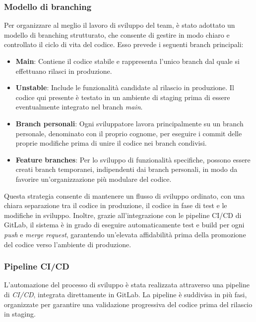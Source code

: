 \subsubsection{Modello di branching}
Per organizzare al meglio il lavoro di sviluppo del team, è stato adottato un modello di branching strutturato, che consente di gestire in modo chiaro e controllato il ciclo di vita del codice. Esso prevede i seguenti branch principali:
\begin{itemize}
  \item \textbf{Main}: Contiene il codice stabile e rappresenta l'unico branch dal quale si effettuano rilasci in produzione.
  \item \textbf{Unstable}: Include le funzionalità candidate al rilascio in produzione. Il codice qui presente è testato in un ambiente di staging prima di essere eventualmente integrato nel branch \textit{main}.
  \item \textbf{Branch personali}: Ogni sviluppatore lavora principalmente su un branch personale, denominato con il proprio cognome, per eseguire i commit delle proprie modifiche prima di unire il codice nei branch condivisi.
  \item \textbf{Feature branches}: Per lo sviluppo di funzionalità specifiche, possono essere creati branch temporanei, indipendenti dai branch personali, in modo da favorire un'organizzazione più modulare del codice.
\end{itemize}
%
Questa strategia consente di mantenere un flusso di sviluppo ordinato, con una chiara separazione tra il codice in produzione, il codice in fase di test e le modifiche in sviluppo. Inoltre, grazie all'integrazione con le pipeline CI/CD di GitLab, il sistema è in grado di eseguire automaticamente test e build per ogni \textit{push} e \textit{merge request}, garantendo un'elevata affidabilità prima della promozione del codice verso l'ambiente di produzione.

\subsubsection{Pipeline CI/CD}
L'automazione del processo di sviluppo è stata realizzata attraverso una pipeline di \textit{CI/CD}, integrata direttamente in GitLab. La pipeline è suddivisa in più fasi, organizzate per garantire una validazione progressiva del codice prima del rilascio in staging.

